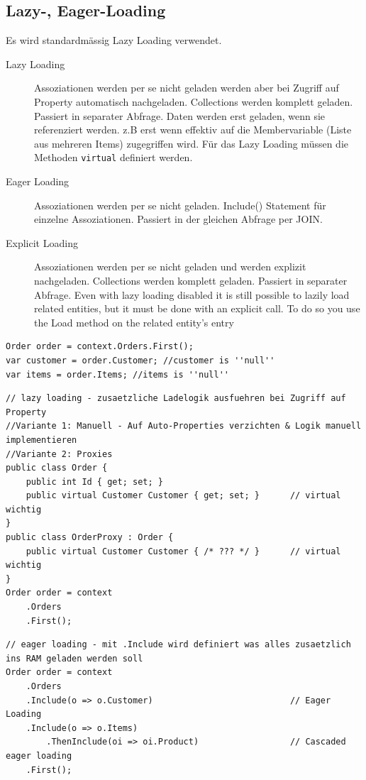 \documentclass[
a4paper,
oneside,
10pt,
fleqn,
headsepline,
toc=listofnumbered, 
bibliography=totocnumbered]{scrartcl}
\begin{document}
\subsection{Lazy-, Eager-Loading}
Es wird standardmässig Lazy Loading verwendet.
\begin{description}
	\item[Lazy Loading] Assoziationen werden per se nicht geladen werden aber bei Zugriff auf Property automatisch nachgeladen. Collections werden komplett geladen. Passiert in separater Abfrage.
		Daten werden erst geladen, wenn sie referenziert werden. z.B erst wenn effektiv auf die Membervariable (Liste aus mehreren Items) zugegriffen wird. Für das Lazy Loading müssen die Methoden \lstinline|virtual| definiert werden.
	\item[Eager Loading] Assoziationen werden per se nicht geladen. Include() Statement für einzelne Assoziationen. Passiert in der gleichen Abfrage per JOIN.
	\item[Explicit Loading] Assoziationen werden per se nicht geladen und werden explizit nachgeladen. Collections werden komplett geladen. Passiert in separater Abfrage.
		Even with lazy loading disabled it is still possible to lazily load related entities, but it must be done with an explicit call. To do so you use the Load method on the related entity’s entry
\end{description}
\begin{lstlisting}
Order order = context.Orders.First();
var customer = order.Customer; //customer is ''null''
var items = order.Items; //items is ''null''
\end{lstlisting}

\begin{lstlisting}
// lazy loading - zusaetzliche Ladelogik ausfuehren bei Zugriff auf Property
//Variante 1: Manuell - Auf Auto-Properties verzichten & Logik manuell implementieren
//Variante 2: Proxies 
public class Order {
    public int Id { get; set; }
    public virtual Customer Customer { get; set; }      // virtual wichtig
}
public class OrderProxy : Order {
    public virtual Customer Customer { /* ??? */ }      // virtual wichtig
}
Order order = context
    .Orders
    .First();
\end{lstlisting}

\begin{lstlisting}
// eager loading - mit .Include wird definiert was alles zusaetzlich ins RAM geladen werden soll
Order order = context
    .Orders
    .Include(o => o.Customer)                           // Eager Loading
    .Include(o => o.Items)
        .ThenInclude(oi => oi.Product)                  // Cascaded eager loading
    .First();
\end{lstlisting}
\end{document}
